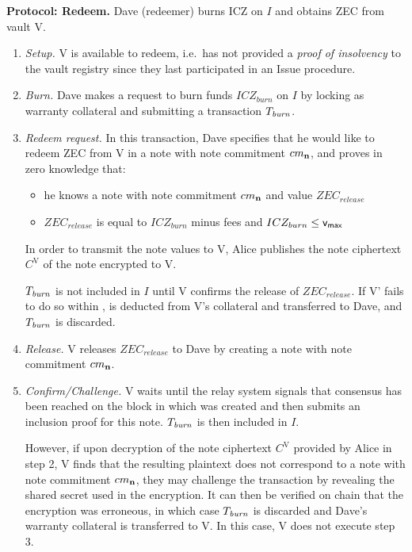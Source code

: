 \textbf{Protocol: Redeem.} Dave (redeemer) burns ICZ on $I$ and obtains ZEC from vault V.
\begin{enumerate}[start=0]
    \item \emph{Setup.} V is available to redeem, i.e.\ has not provided a \emph{proof of insolvency} to the vault registry since they last participated in an Issue procedure.
    
    \item \emph{Burn.} Dave makes a request to burn funds $ICZ_{burn}$ on $I$ by locking \iw as warranty collateral and submitting a transaction $T_{\mathit{burn}}$.
    
    \item \emph{Redeem request.} In this transaction, Dave specifies that he would like to redeem ZEC from V in a note \n with note commitment $cm_\mathbf{n}$, and proves in zero knowledge that:
    \begin{itemize}
        \item he knows a note \n with note commitment $cm_\mathbf{n}$ and value $ZEC_{release}$
        \item $ZEC_{release}$ is equal to $ICZ_{burn}$ minus fees and $ICZ_{burn} \leq \mathsf{v_{max}}$
    \end{itemize}
    
    In order to transmit the note values to V, Alice publishes the note ciphertext $C^{\text{V}}$ of the note \n encrypted to V.
    
    $T_{\mathit{burn}}$ is not included in $I$ until V confirms the release of $ZEC_{release}$.
    If V' fails to do so within \dcr, \iw is deducted from V's collateral and transferred to Dave, and $T_{\mathit{burn}}$ is discarded.
    
    \item \emph{Release.} V releases $ZEC_{release}$ to Dave by creating a note \n with note commitment $cm_\mathbf{n}$.

    \item \emph{Confirm/Challenge.} V waits until the relay system signals that consensus has been reached on the block in which \n was created and then submits an inclusion proof for this note.
    $T_{\mathit{burn}}$ is then included in $I$.
    
    However, if upon decryption of the note ciphertext $C^{\text{V}}$ provided by Alice in step 2, V finds that the resulting plaintext does not correspond to a note with note commitment $cm_\mathbf{n}$, they may challenge the transaction by revealing the shared secret used in the encryption.
    It can then be verified on chain that the encryption was erroneous, in which case $T_{\mathit{burn}}$ is discarded and Dave's warranty collateral is transferred to V.
    In this case, V does not execute step 3.
\end{enumerate}
